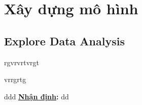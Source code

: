 \chapter{Xây dựng mô hình}

\section{Explore Data Analysis}

rgvrvrtvrgt \par
vrrgrtg \par

ddd \textbf{\underline{Nhận định}:} dd